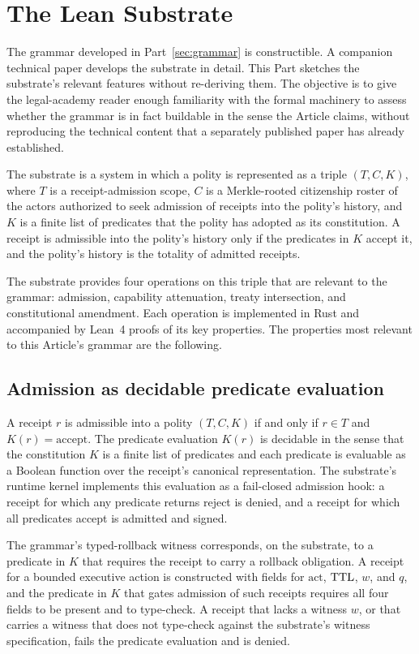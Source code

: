 \section{The Lean Substrate}
\label{sec:substrate}

The grammar developed in Part~\ref{sec:grammar} is constructible.
A companion technical paper \cite{ref_chio_parent_paper} develops the substrate in detail.
This Part sketches the substrate's relevant features without re-deriving them.
The objective is to give the legal-academy reader enough familiarity with the formal machinery to assess
whether the grammar is in fact buildable in the sense the Article claims,
without reproducing the technical content that a separately published paper has already established.

The substrate is a system in which a polity is represented as a triple
$(T, C, K)$,
where $T$ is a receipt-admission scope, $C$ is a Merkle-rooted citizenship roster of the actors authorized to seek
admission of receipts into the polity's history, and $K$ is a finite list of predicates that the polity has
adopted as its constitution.
A receipt is admissible into the polity's history only if the predicates in $K$ accept it,
and the polity's history is the totality of admitted receipts.

The substrate provides four operations on this triple that are relevant to the grammar:
admission, capability attenuation, treaty intersection, and constitutional amendment.
Each operation is implemented in Rust and accompanied by Lean~4 proofs of its key properties.
The properties most relevant to this Article's grammar are the following.

\subsection{Admission as decidable predicate evaluation}

A receipt $r$ is admissible into a polity $(T, C, K)$ if and only if $r \in T$ and $K(r) = \text{accept}$.
The predicate evaluation $K(r)$ is decidable in the sense that the constitution $K$ is a finite list of
predicates and each predicate is evaluable as a Boolean function over the receipt's canonical representation.
The substrate's runtime kernel implements this evaluation as a fail-closed admission hook:
a receipt for which any predicate returns reject is denied,
and a receipt for which all predicates accept is admitted and signed.

The grammar's typed-rollback witness corresponds, on the substrate, to a predicate in $K$ that requires the receipt
to carry a rollback obligation.
A receipt for a bounded executive action is constructed with fields for $\text{act}$, $\mathrm{TTL}$, $w$, and $q$,
and the predicate in $K$ that gates admission of such receipts requires all four fields to be present and to type-check.
A receipt that lacks a witness $w$, or that carries a witness that does not type-check against the substrate's
witness specification,
fails the predicate evaluation and is denied.

